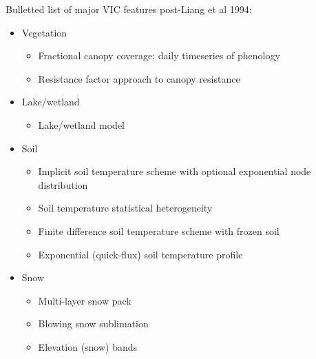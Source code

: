 \documentclass[gmd, manuscript]{copernicus}
\begin{document}
Bulletted list of major VIC features post-Liang et al 1994:
\begin{itemize}
\item Vegetation
\begin{itemize}
\item Fractional canopy coverage; daily timeseries of phenology \citep{Bohn_2016}
\item Resistance factor approach to canopy resistance \citep{Wigmosta_1994}
\end{itemize}
\item Lake/wetland
\begin{itemize}
\item Lake/wetland model \citep{Bowling_2010}
\end{itemize}
\item Soil
\begin{itemize}
\item Implicit soil temperature scheme with optional exponential node distribution \citep{Adam_2008}
\item Soil temperature statistical heterogeneity \citep{Cherkauer_2003}
\item Finite difference soil temperature scheme with frozen soil\citep{Cherkauer_1999}
\item Exponential (quick-flux) soil temperature profile \citep{Liang_1999}
\end{itemize}
\item Snow
\begin{itemize}
\item Multi-layer snow pack \citep{Andreadis_2009}
\item Blowing snow sublimation \citep{Bowling_2004}
\item Elevation (snow) bands \citep{Nijssen_1997}
\end{itemize}
\end{itemize}
\end{document}
